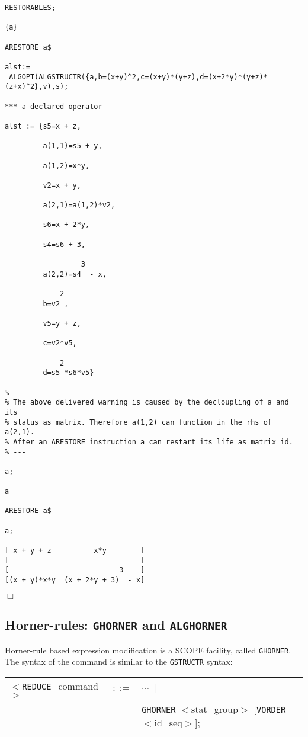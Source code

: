 {\small
\begin{verbatim}
RESTORABLES;

{a}

ARESTORE a$

alst:=
 ALGOPT(ALGSTRUCTR({a,b=(x+y)^2,c=(x+y)*(y+z),d=(x+2*y)*(y+z)*(z+x)^2},v),s);

*** a declared operator 

alst := {s5=x + z,

         a(1,1)=s5 + y,

         a(1,2)=x*y,

         v2=x + y,

         a(2,1)=a(1,2)*v2,

         s6=x + 2*y,

         s4=s6 + 3,

                  3
         a(2,2)=s4  - x,

             2
         b=v2 ,

         v5=y + z,

         c=v2*v5,

             2
         d=s5 *s6*v5}

% ---
% The above delivered warning is caused by the decloupling of a and its
% status as matrix. Therefore a(1,2) can function in the rhs of a(2,1).
% After an ARESTORE instruction a can restart its life as matrix_id.
% ---

a;

a

ARESTORE a$

a;

[ x + y + z          x*y        ]
[                               ]
[                          3    ]
[(x + y)*x*y  (x + 2*y + 3)  - x]
\end{verbatim}
\begin{flushright}
$\Box$
\end{flushright}}

\subsection{Horner-rules: {\tt GHORNER} and {\tt ALGHORNER}} \label{SSF:Hr}

Horner-rule based expression modification is a SCOPE facility, 
called {\tt GHORNER}. The syntax of the command is similar to the
{\tt GSTRUCTR} syntax: 

\begin{center}
\begin{tabular}{lcl}
$<${\tt REDUCE}\_command$>$ & $::=$ & $\cdots~\mid$\\
& & {\tt GHORNER} $<$stat\_group$>$ [{\tt VORDER} $<$id\_seq$>$];
\end{tabular}
\end{center}

